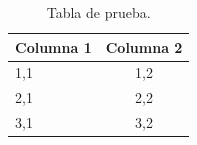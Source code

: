 \begin{table}[ht!]                            %
  \centering                                  %
  \begin{tabular}{lc}                         %
      \hline                                  %
      \textbf{Columna 1} & \textbf{Columna 2} \\ %
      \hline
      1,1 & 1,2 \\
      2,1 & 2,2 \\
      3,1 & 3,2 \\
      \hline
  \end{tabular}
  \caption{Tabla de prueba.}                  %
  \label{table:tabla01}                       %
\end{table}